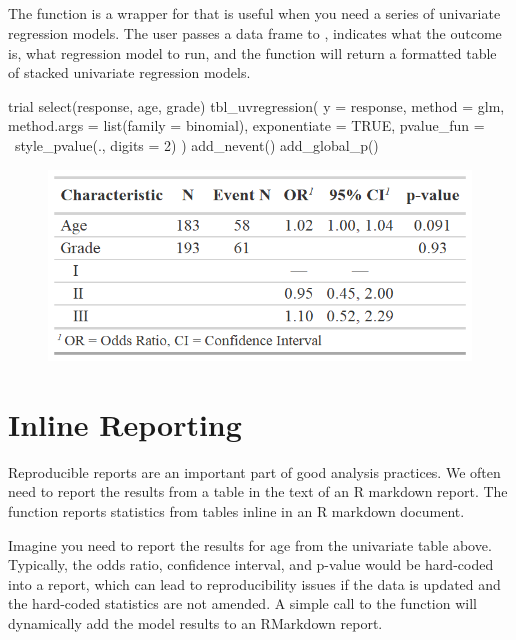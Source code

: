 \subsection{\texorpdfstring{}{tbl\_uvregression()}}

The  function is a wrapper for  that is useful when you need a series of univariate regression models.
The user passes a data frame to , indicates what the outcome is, what regression model to run, and the function will return a formatted table of stacked univariate regression models.

\begin{example}
trial %
  select(response, age, grade) %
  tbl_uvregression(
    y = response, 
    method = glm,
    method.args = list(family = binomial),
    exponentiate = TRUE,
    pvalue_fun = ~style_pvalue(., digits = 2)
  ) %
  add_nevent() %
  add_global_p()
\end{example}
\newpage
\begin{figure}[h!]
  \includegraphics[scale=0.49]{uvregression.png}
  \centering
\end{figure}

\section{Inline Reporting}

Reproducible reports are an important part of good analysis practices.
We often need to report the results from a table in the text of an R markdown report.
The   function reports statistics from  tables inline in an R markdown document.

Imagine you need to report the results for age from the univariate table above.
Typically, the odds ratio, confidence interval, and p-value would be hard-coded into a report, which can lead to reproducibility issues if the data is updated and the hard-coded statistics are not amended.
A simple call to the  function will dynamically add the model results to an RMarkdown report.

